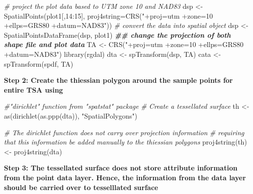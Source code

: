 \documentclass[
]{book}
\newenvironment{Shaded}{\begin{snugshade}}{\end{snugshade}}
\newcommand{\AttributeTok}[1]{\textcolor[rgb]{0.77,0.63,0.00}{#1}}
\newcommand{\CommentTok}[1]{\textcolor[rgb]{0.56,0.35,0.01}{\textit{#1}}}
\newcommand{\DecValTok}[1]{\textcolor[rgb]{0.00,0.00,0.81}{#1}}
\newcommand{\DocumentationTok}[1]{\textcolor[rgb]{0.56,0.35,0.01}{\textbf{\textit{#1}}}}
\newcommand{\FunctionTok}[1]{\textcolor[rgb]{0.00,0.00,0.00}{#1}}
\newcommand{\NormalTok}[1]{#1}
\newcommand{\OtherTok}[1]{\textcolor[rgb]{0.56,0.35,0.01}{#1}}
\newcommand{\SpecialCharTok}[1]{\textcolor[rgb]{0.00,0.00,0.00}{#1}}
\newcommand{\StringTok}[1]{\textcolor[rgb]{0.31,0.60,0.02}{#1}}
\begin{document}
\begin{Shaded}
\begin{Highlighting}[]
\CommentTok{\# project the plot data based to UTM zone 10 and NAD83}
\NormalTok{dsp }\OtherTok{\textless{}{-}} \FunctionTok{SpatialPoints}\NormalTok{(plot1[,}\DecValTok{14}\SpecialCharTok{:}\DecValTok{15}\NormalTok{], }\AttributeTok{proj4string=}\FunctionTok{CRS}\NormalTok{(}\StringTok{"+proj=utm +zone=10 +ellps=GRS80 +datum=NAD83"}\NormalTok{))}
\CommentTok{\# convert the data into spatial object}
\NormalTok{dsp }\OtherTok{\textless{}{-}} \FunctionTok{SpatialPointsDataFrame}\NormalTok{(dsp, plot1)}
\DocumentationTok{\#\# change the projection of both shape file and plot data}
\NormalTok{TA }\OtherTok{\textless{}{-}} \FunctionTok{CRS}\NormalTok{(}\StringTok{"+proj=utm +zone=10 +ellps=GRS80 +datum=NAD83"}\NormalTok{)}
\FunctionTok{library}\NormalTok{(rgdal)}
\NormalTok{dta }\OtherTok{\textless{}{-}} \FunctionTok{spTransform}\NormalTok{(dsp, TA)}
\NormalTok{cata }\OtherTok{\textless{}{-}} \FunctionTok{spTransform}\NormalTok{(spdf, TA)}
\end{Highlighting}
\end{Shaded}

\textbf{Step 2: Create the thiessian polygon around the sample points for entire TSA using}

\begin{Shaded}
\begin{Highlighting}[]
\CommentTok{\#"dirichlet" function from "spatstat" package}
\CommentTok{\# Create a tessellated surface}
\NormalTok{th  }\OtherTok{\textless{}{-}}  \FunctionTok{as}\NormalTok{(}\FunctionTok{dirichlet}\NormalTok{(}\FunctionTok{as.ppp}\NormalTok{(dta)), }\StringTok{"SpatialPolygons"}\NormalTok{)}

\CommentTok{\# The dirichlet function does not carry over projection information}
\CommentTok{\# requiring that this information be added manually to the thiessian polygons}
\FunctionTok{proj4string}\NormalTok{(th) }\OtherTok{\textless{}{-}} \FunctionTok{proj4string}\NormalTok{(dta)}
\end{Highlighting}
\end{Shaded}

\textbf{Step 3: The tessellated surface does not store attribute information from the point data layer. Hence, the information from the data layer should be carried over to tesselllated surface }
\end{document}
